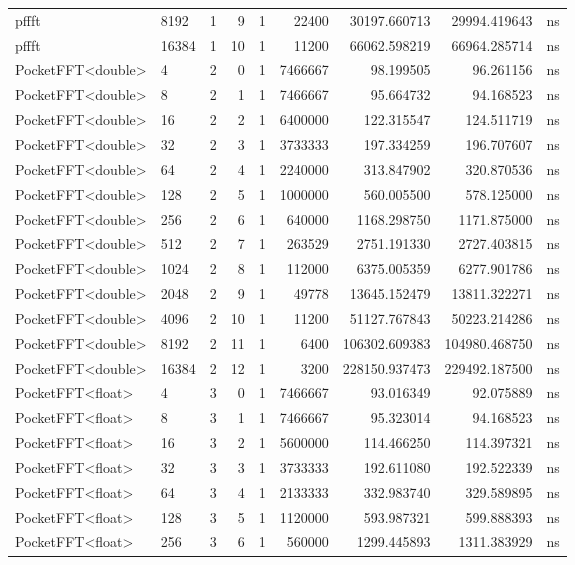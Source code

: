 \begin{tabular}{llrrrrrrl}
pffft & 8192 & 1 & 9 & 1 & 22400 & 30197.660713 & 29994.419643 & ns \\
pffft & 16384 & 1 & 10 & 1 & 11200 & 66062.598219 & 66964.285714 & ns \\
PocketFFT<double> & 4 & 2 & 0 & 1 & 7466667 & 98.199505 & 96.261156 & ns \\
PocketFFT<double> & 8 & 2 & 1 & 1 & 7466667 & 95.664732 & 94.168523 & ns \\
PocketFFT<double> & 16 & 2 & 2 & 1 & 6400000 & 122.315547 & 124.511719 & ns \\
PocketFFT<double> & 32 & 2 & 3 & 1 & 3733333 & 197.334259 & 196.707607 & ns \\
PocketFFT<double> & 64 & 2 & 4 & 1 & 2240000 & 313.847902 & 320.870536 & ns \\
PocketFFT<double> & 128 & 2 & 5 & 1 & 1000000 & 560.005500 & 578.125000 & ns \\
PocketFFT<double> & 256 & 2 & 6 & 1 & 640000 & 1168.298750 & 1171.875000 & ns \\
PocketFFT<double> & 512 & 2 & 7 & 1 & 263529 & 2751.191330 & 2727.403815 & ns \\
PocketFFT<double> & 1024 & 2 & 8 & 1 & 112000 & 6375.005359 & 6277.901786 & ns \\
PocketFFT<double> & 2048 & 2 & 9 & 1 & 49778 & 13645.152479 & 13811.322271 & ns \\
PocketFFT<double> & 4096 & 2 & 10 & 1 & 11200 & 51127.767843 & 50223.214286 & ns \\
PocketFFT<double> & 8192 & 2 & 11 & 1 & 6400 & 106302.609383 & 104980.468750 & ns \\
PocketFFT<double> & 16384 & 2 & 12 & 1 & 3200 & 228150.937473 & 229492.187500 & ns \\
PocketFFT<float> & 4 & 3 & 0 & 1 & 7466667 & 93.016349 & 92.075889 & ns \\
PocketFFT<float> & 8 & 3 & 1 & 1 & 7466667 & 95.323014 & 94.168523 & ns \\
PocketFFT<float> & 16 & 3 & 2 & 1 & 5600000 & 114.466250 & 114.397321 & ns \\
PocketFFT<float> & 32 & 3 & 3 & 1 & 3733333 & 192.611080 & 192.522339 & ns \\
PocketFFT<float> & 64 & 3 & 4 & 1 & 2133333 & 332.983740 & 329.589895 & ns \\
PocketFFT<float> & 128 & 3 & 5 & 1 & 1120000 & 593.987321 & 599.888393 & ns \\
PocketFFT<float> & 256 & 3 & 6 & 1 & 560000 & 1299.445893 & 1311.383929 & ns \\

\end{tabular}
